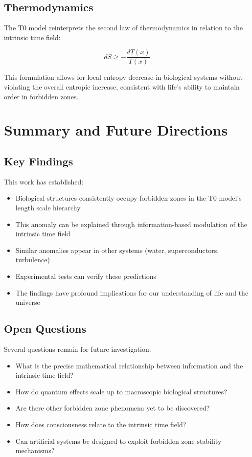 \documentclass[12pt,a4paper]{article}
\newcommand{\Tfield}{T(x)}
\begin{document}
	\subsection{Thermodynamics}
	\label{subsec:thermodynamics_integration}
	
	The T0 model reinterprets the second law of thermodynamics in relation to the intrinsic time field:
	
	\begin{equation}
		dS \geq -\frac{d\Tfield}{\Tfield}
	\end{equation}
	
	This formulation allows for local entropy decrease in biological systems without violating the overall entropic increase, consistent with life's ability to maintain order in forbidden zones.
	
	\section{Summary and Future Directions}
	\label{sec:summary}
	
	\subsection{Key Findings}
	\label{subsec:key_findings}
	
	This work has established:
	
	\begin{itemize}
		\item Biological structures consistently occupy forbidden zones in the T0 model's length scale hierarchy
		\item This anomaly can be explained through information-based modulation of the intrinsic time field
		\item Similar anomalies appear in other systems (water, superconductors, turbulence)
		\item Experimental tests can verify these predictions
		\item The findings have profound implications for our understanding of life and the universe
	\end{itemize}
	
	\subsection{Open Questions}
	\label{subsec:open_questions}
	
	Several questions remain for future investigation:
	
	\begin{itemize}
		\item What is the precise mathematical relationship between information and the intrinsic time field?
		\item How do quantum effects scale up to macroscopic biological structures?
		\item Are there other forbidden zone phenomena yet to be discovered?
		\item How does consciousness relate to the intrinsic time field?
		\item Can artificial systems be designed to exploit forbidden zone stability mechanisms?
	\end{itemize}
	
\end{document}
